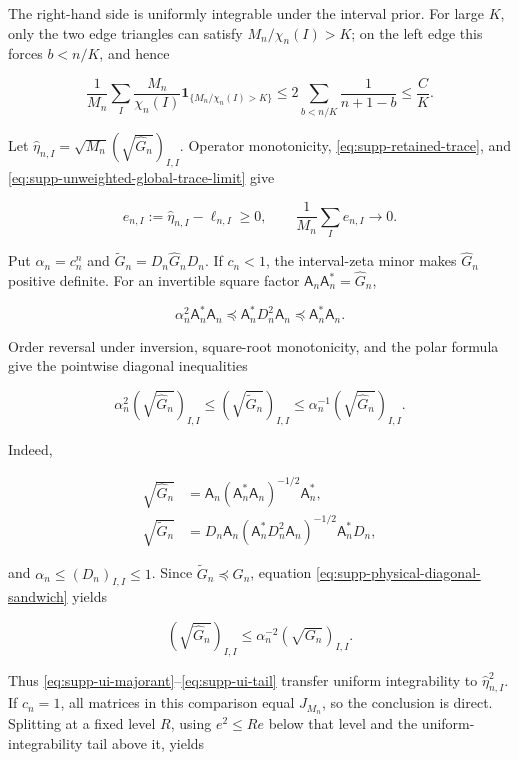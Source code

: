 The right-hand side is uniformly integrable under the interval prior.  For
large \(K\), only the two edge triangles can satisfy
\(M_n/\chi_n(I)>K\); on the left edge this forces \(b<n/K\), and hence

\begin{equation}\label{eq:supp-ui-tail}
 \frac1{M_n}\sum_I\frac{M_n}{\chi_n(I)}
 \mathbf1_{\{M_n/\chi_n(I)>K\}}
 \le2\sum_{b<n/K}\frac1{n+1-b}
 \le\frac CK.
\end{equation}

Let
\(\widehat\eta_{n,I}=\sqrt{M_n}(\sqrt{\widehat G_n})_{I,I}\). Operator
monotonicity, \eqref{eq:supp-retained-trace}, and
\eqref{eq:supp-unweighted-global-trace-limit} give

\[
 e_{n,I}:=\widehat\eta_{n,I}-\ell_{n,I}\ge0,
 \qquad \frac1{M_n}\sum_Ie_{n,I}\to0.
\]

Put \(\alpha_n=c_n^n\) and
\(\widetilde G_n=D_n\widehat G_nD_n\).  If \(c_n<1\), the interval-zeta
minor makes \(\widehat G_n\) positive definite.  For an invertible square
factor \(\mathsf A_n\mathsf A_n^*=\widehat G_n\),

\[
 \alpha_n^2\mathsf A_n^*\mathsf A_n
 \preceq \mathsf A_n^*D_n^2\mathsf A_n
 \preceq \mathsf A_n^*\mathsf A_n.
\]

Order reversal under inversion, square-root monotonicity, and the polar
formula give the pointwise diagonal inequalities

\begin{equation}\label{eq:supp-physical-diagonal-sandwich}
 \alpha_n^2(\sqrt{\widehat G_n})_{I,I}
 \le(\sqrt{\widetilde G_n})_{I,I}
 \le\alpha_n^{-1}(\sqrt{\widehat G_n})_{I,I}.
\end{equation}

Indeed,

\begin{align*}
 \sqrt{\widehat G_n}
 &=\mathsf A_n(\mathsf A_n^*\mathsf A_n)^{-1/2}\mathsf A_n^*,\\
 \sqrt{\widetilde G_n}
 &=D_n\mathsf A_n
 (\mathsf A_n^*D_n^2\mathsf A_n)^{-1/2}
 \mathsf A_n^*D_n,
\end{align*}

and \(\alpha_n\le(D_n)_{I,I}\le1\).  Since
\(\widetilde G_n\preceq G_n\), equation
\eqref{eq:supp-physical-diagonal-sandwich} yields

\[
 (\sqrt{\widehat G_n})_{I,I}
 \le\alpha_n^{-2}(\sqrt{G_n})_{I,I}.
\]

Thus \eqref{eq:supp-ui-majorant}--\eqref{eq:supp-ui-tail} transfer uniform
integrability to \(\widehat\eta_{n,I}^2\).  If \(c_n=1\), all matrices in
this comparison equal \(J_{M_n}\), so the conclusion is direct.  Splitting
at a fixed level \(R\), using \(e^2\le Re\) below that level and the
uniform-integrability tail above it, yields

